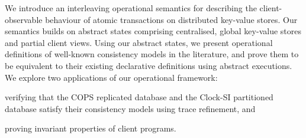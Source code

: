 We introduce an interleaving operational semantics for describing the
client-observable behaviour of atomic transactions on distributed
key-value stores. Our semantics builds on abstract states comprising
centralised, global key-value stores and partial client views. 
Using our abstract states, we present operational definitions of well-known consistency models in the literature, 
and prove them to be equivalent to their existing declarative definitions using abstract executions. 
We explore two applications of our operational framework:
\begin{enumerate*}
	\item verifying that the COPS replicated database and the Clock-SI  partitioned database satisfy their 
consistency models using trace refinement, and 
	\item proving invariant properties of client programs. 
\end{enumerate*}

